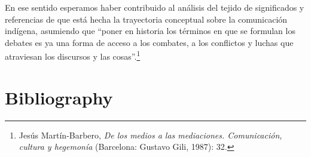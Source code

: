 \documentclass{tufte-handout}
\begin{document}
En ese sentido esperamos haber contribuido al análisis del tejido de
significados y referencias de que está hecha la trayectoria conceptual
sobre la comunicación indígena, asumiendo que ``poner en historia los
términos en que se formulan los debates es ya una forma de acceso a los
combates, a los conflictos y luchas que atraviesan los discursos y las
cosas''.\footnote{Jesús Martín-Barbero, \emph{De los medios a las
  mediaciones. Comunicación, cultura y hegemonía} (Barcelona: Gustavo
  Gili, 1987): 32.}







\section{Bibliography}\label{bibliography}
\end{document}
